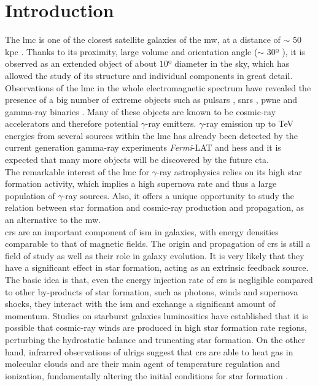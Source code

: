 \documentclass[main.tex]{subfiles}
\begin{document}
\glsresetall

\section{Introduction}

The \gls{lmc} is one of the closest satellite galaxies of the \gls{mw}, at a distance of $\sim$ 50 kpc \cite{2013LMCdistance1}. Thanks to its proximity, large volume and orientation angle ($\sim$ 30º \cite{2004StructureandOrientationLMC}), it is observed as an extended object of about 10º diameter in the sky, which has allowed the study of its structure and individual components in great detail. Observations of the \gls{lmc} in the whole electromagnetic spectrum have revealed the presence of a big number of extreme objects such as pulsars \cite{2013RadioPulsarsLMC} \cite{2016LMCFermiLAT}, \glspl{snr} \cite{2015MultiwavelengthLMCsnr} \cite{2012XMM1987} \cite{2016SNRinXrayLMC},  \gls{pwne} \cite{2015HESSTeVLMC} \cite{2016LMCFermiLAT} \cite{2003PWNeintheLMC} \cite{2008PWNeXrayLMC} and gamma-ray binaries \cite{2017HESSLMCP3}. Many of these objects are known to be cosmic-ray accelerators and therefore potential $\gamma$-ray emitters. $\gamma$-ray emission up to TeV energies from several sources within the \gls{lmc} has already been detected by the current generation gamma-ray experiments \textit{Fermi}-LAT and \gls{hess} and it is expected that many more objects will be discovered by the future \gls{cta}.\\
The remarkable interest of the \gls{lmc} for $\gamma$-ray astrophysics relies on its high star formation activity, which implies a high supernova rate and thus a large population of $\gamma$-ray sources. Also, it offers a unique opportunity to study the relation between star formation and cosmic-ray production and propagation, as an alternative to the \gls{mw}.\\
\glspl{cr} are an important component of \gls{ism} in galaxies, with energy densities comparable to that of magnetic fields. The origin and propagation of \glspl{cr} is still a field of study as well as their role in galaxy evolution. It is very likely that they have a significant effect in star formation, acting as an extrinsic feedback source. The basic idea is that, even the energy injection rate of \glspl{cr} is negligible compared to other by-products of star formation, such as photons, winds and supernova shocks, they interact with the \gls{ism} and exchange a significant amount of momentum. Studies on starburst galaxies luminosities \cite{2008SocratesCRandSF} have established that it is possible that cosmic-ray winds are produced in high star formation rate regions, perturbing the hydrostatic balance and truncating star formation. On the other hand, infrarred observations of \gls{ulrigs} suggest that \glspl{cr} are able to heat gas in molecular clouds and are their main agent of temperature regulation and ionization, fundamentally altering the initial conditions for star formation \cite{2010PapadopoulosCRinSF}.\\
\end{document}
